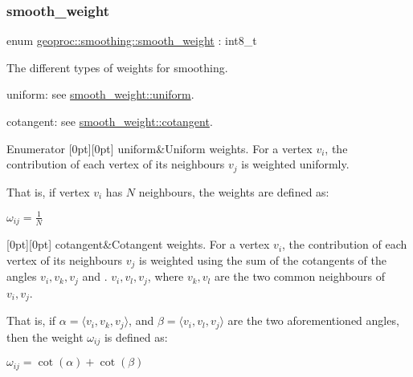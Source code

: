 \subsubsection{\texorpdfstring{smooth\+\_\+weight}{smooth\_weight}}
{\footnotesize\ttfamily enum \hyperlink{namespacegeoproc_1_1smoothing_a76e43f405426c150569712512de58028}{geoproc\+::smoothing\+::smooth\+\_\+weight} \+: int8\+\_\+t\hspace{0.3cm}{\ttfamily [strong]}}



The different types of weights for smoothing. 


\begin{DoxyItemize}
\item uniform\+: see \hyperlink{namespacegeoproc_1_1smoothing_a76e43f405426c150569712512de58028aa489ffed938ef1b9e86889bc413501ee}{smooth\+\_\+weight\+::uniform}.
\item cotangent\+: see \hyperlink{namespacegeoproc_1_1smoothing_a76e43f405426c150569712512de58028a8e8ea879f40475ae2c70be8b296bf950}{smooth\+\_\+weight\+::cotangent}. 
\end{DoxyItemize}\begin{DoxyEnumFields}{Enumerator}
[0pt][0pt]{}\mbox{\label{namespacegeoproc_1_1smoothing_a76e43f405426c150569712512de58028aa489ffed938ef1b9e86889bc413501ee}} 
uniform&Uniform weights. For a vertex $v_i$, the contribution of each vertex of its neighbours $v_j$ is weighted uniformly.

That is, if vertex $v_i$ has $N$ neighbours, the weights are defined as\+:

$ \omega_{ij} = \frac{1}{N} $ \\
\hline

[0pt][0pt]{}\mbox{\label{namespacegeoproc_1_1smoothing_a76e43f405426c150569712512de58028a8e8ea879f40475ae2c70be8b296bf950}} 
cotangent&Cotangent weights. For a vertex $v_i$, the contribution of each vertex of its neighbours $v_j$ is weighted using the sum of the cotangents of the angles $ v_i,v_k,v_j $ and . $ v_i,v_l,v_j $, where $ v_k,v_l $ are the two common neighbours of $ v_i,v_j $.

That is, if $ \alpha = \langle v_i,v_k,v_j \rangle $, and $ \beta = \langle v_i,v_l,v_j \rangle $ are the two aforementioned angles, then the weight $ \omega_{ij} $ is defined as\+:

$ \omega_{ij} = \cot(\alpha) + \cot(\beta) $ \\
\hline

\end{DoxyEnumFields}
